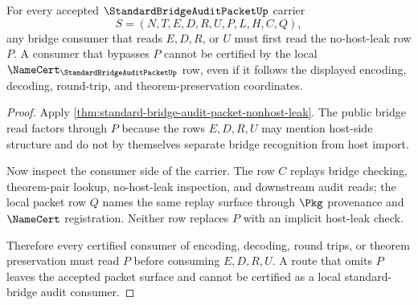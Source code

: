 \begin{theorem}
\label{thm:standard-bridge-audit-packet-host-leak-consumer-coverage}
For every accepted $\StandardBridgeAuditPacketUp$ carrier
$$
S=(N,T,E,D,R,U,P,L,H,C,Q),
$$
any bridge consumer that reads $E,D,R$, or $U$ must first read the no-host-leak row $P$. A consumer that bypasses $P$ cannot be certified by the local $\NameCert_{\StandardBridgeAuditPacketUp}$ row, even if it follows the displayed encoding, decoding, round-trip, and theorem-preservation coordinates.
\end{theorem}
\begin{proof}
Apply \autoref{thm:standard-bridge-audit-packet-nonhost-leak}. The public bridge read factors through $P$ because the rows $E,D,R,U$ may mention host-side structure and do not by themselves separate bridge recognition from host import.

Now inspect the consumer side of the carrier. The row $C$ replays bridge checking, theorem-pair lookup, no-host-leak inspection, and downstream audit reads; the local packet row $Q$ names the same replay surface through $\Pkg$ provenance and $\NameCert$ registration. Neither row replaces $P$ with an implicit host-leak check.

Therefore every certified consumer of encoding, decoding, round trips, or theorem preservation must read $P$ before consuming $E,D,R,U$. A route that omits $P$ leaves the accepted packet surface and cannot be certified as a local standard-bridge audit consumer.
\end{proof}

